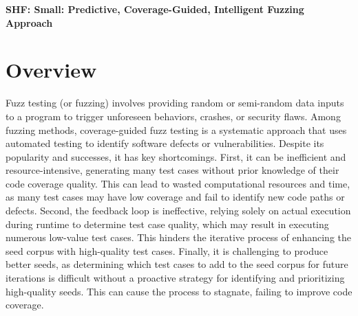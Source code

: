 \documentclass[11pt]{article}
\begin{document}



\begin{center}
  {\bf SHF: Small: Predictive, Coverage-Guided, Intelligent Fuzzing Approach}
\end{center}
\vspace{-.1in}



\section{Overview}

Fuzz testing (or fuzzing) involves providing random or semi-random data inputs to a program to trigger unforeseen behaviors, crashes, or security flaws. Among fuzzing methods, coverage-guided fuzz testing is a systematic approach that uses automated testing to identify software defects or vulnerabilities. Despite its popularity and successes, it has key shortcomings. First, it can be inefficient and resource-intensive, generating many test cases without prior knowledge of their code coverage quality. This can lead to wasted computational resources and time, as many test cases may have low coverage and fail to identify new code paths or defects. Second, the feedback loop is ineffective, relying solely on actual execution during runtime to determine test case quality, which may result in executing numerous low-value test cases. This hinders the iterative process of enhancing the seed corpus with high-quality test cases. Finally, it is challenging to produce better seeds, as determining which test cases to add to the seed corpus for future iterations is difficult without a proactive strategy for identifying and prioritizing high-quality seeds. This can cause the process to stagnate, failing to improve code coverage.
\end{document}
